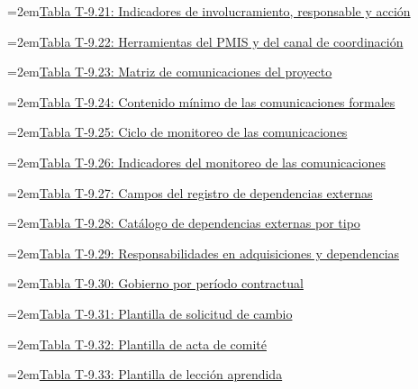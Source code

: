 \documentclass[11pt]{article}
\begin{document}
\noindent\hangindent=2em\hyperref[tab:t9-ind-interesados]{Tabla T-9.21: Indicadores de involucramiento, responsable y acción}\dotfill\pageref{tab:t9-ind-interesados}\par\vspace{0.4\baselineskip}
\noindent\hangindent=2em\hyperref[tab:t9-pmis]{Tabla T-9.22: Herramientas del PMIS y del canal de coordinación}\dotfill\pageref{tab:t9-pmis}\par\vspace{0.4\baselineskip}
\noindent\hangindent=2em\hyperref[tab:t9-matriz-com]{Tabla T-9.23: Matriz de comunicaciones del proyecto}\dotfill\pageref{tab:t9-matriz-com}\par\vspace{0.4\baselineskip}
\noindent\hangindent=2em\hyperref[tab:t9-contenidos]{Tabla T-9.24: Contenido mínimo de las comunicaciones formales}\dotfill\pageref{tab:t9-contenidos}\par\vspace{0.4\baselineskip}
\noindent\hangindent=2em\hyperref[tab:t9-ciclo]{Tabla T-9.25: Ciclo de monitoreo de las comunicaciones}\dotfill\pageref{tab:t9-ciclo}\par\vspace{0.4\baselineskip}
\noindent\hangindent=2em\hyperref[tab:t9-ind-com]{Tabla T-9.26: Indicadores del monitoreo de las comunicaciones}\dotfill\pageref{tab:t9-ind-com}\par\vspace{0.4\baselineskip}
\noindent\hangindent=2em\hyperref[tab:t9-dep-campos]{Tabla T-9.27: Campos del registro de dependencias externas}\dotfill\pageref{tab:t9-dep-campos}\par\vspace{0.4\baselineskip}
\noindent\hangindent=2em\hyperref[tab:t9-dep-tipos]{Tabla T-9.28: Catálogo de dependencias externas por tipo}\dotfill\pageref{tab:t9-dep-tipos}\par\vspace{0.4\baselineskip}
\noindent\hangindent=2em\hyperref[tab:t9-dep-roles]{Tabla T-9.29: Responsabilidades en adquisiciones y dependencias}\dotfill\pageref{tab:t9-dep-roles}\par\vspace{0.4\baselineskip}
\noindent\hangindent=2em\hyperref[tab:t9-etapas]{Tabla T-9.30: Gobierno por período contractual}\dotfill\pageref{tab:t9-etapas}\par\vspace{0.4\baselineskip}
\noindent\hangindent=2em\hyperref[tab:t9-pl-cambio]{Tabla T-9.31: Plantilla de solicitud de cambio}\dotfill\pageref{tab:t9-pl-cambio}\par\vspace{0.4\baselineskip}
\noindent\hangindent=2em\hyperref[tab:t9-pl-acta]{Tabla T-9.32: Plantilla de acta de comité}\dotfill\pageref{tab:t9-pl-acta}\par\vspace{0.4\baselineskip}
\noindent\hangindent=2em\hyperref[tab:t9-pl-leccion]{Tabla T-9.33: Plantilla de lección aprendida}\dotfill\pageref{tab:t9-pl-leccion}\par\vspace{0.4\baselineskip}
\clearpage
\end{document}

